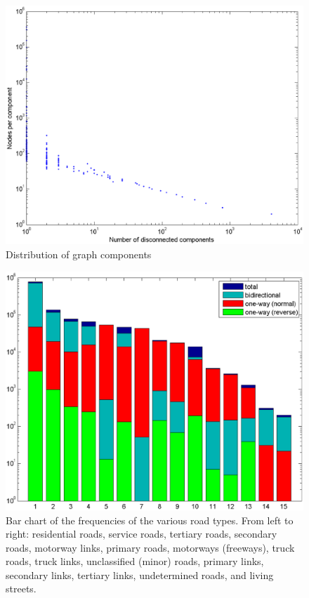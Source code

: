 \documentclass{sig-alternate}
\begin{document}
\begin{figure}
\includegraphics[scale=.20]{components.eps}
\caption{Distribution of graph components}
\end{figure}

\begin{figure}
\includegraphics[scale=.20]{roads.eps}
\caption{Bar chart of the frequencies of the various road types. From left to right: residential roads, service roads, tertiary roads, secondary roads, motorway links, primary roads, motorways (freeways), truck roads, truck links, unclassified (minor) roads, primary links, secondary links, tertiary links, undetermined roads, and living streets.}
\end{figure}
\end{document}
